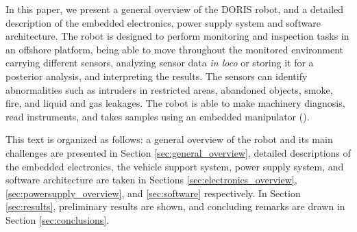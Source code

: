 In this paper, we present a general overview of the DORIS robot, and a detailed description of the embedded electronics, power supply system and software architecture. The robot is designed to perform monitoring and inspection tasks in an
offshore platform, being able to move throughout the monitored environment carrying different sensors, analyzing sensor data \emph{in loco} or storing it for a posterior analysis, and interpreting the results. The sensors can identify abnormalities such as intruders in restricted areas, abandoned objects, smoke, fire, and liquid and gas leakages.
The robot is able to make machinery diagnosis, read instruments, and takes samples using an embedded manipulator (\cite{cba}).

This text is organized as follows: a general overview of the robot and its main
challenges are presented in Section \ref{sec:general_overview}, detailed
descriptions of the embedded electronics, the vehicle support system, power
supply system, and software architecture are taken in
Sections \ref{sec:electronics_overview}, \ref{sec:powersupply_overview}, and
\ref{sec:software} respectively.
In Section \ref{sec:results}, preliminary results are shown, and concluding
remarks are drawn in Section \ref{sec:conclusions}.